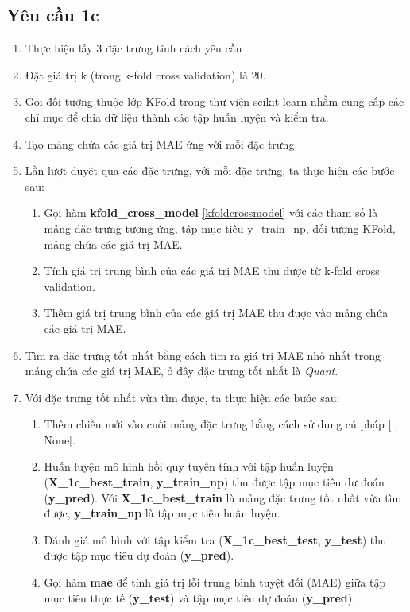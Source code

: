 \documentclass[]{article}
\begin{document}
\subsection{Yêu cầu 1c}
\begin{enumerate}
  \item Thực hiện lấy 3 đặc trưng tính cách yêu cầu
  \item Đặt giá trị k (trong k-fold cross validation) là 20.
  \item Gọi đối tượng thuộc lớp KFold trong thư viện scikit-learn nhằm cung cấp các chỉ mục để chia dữ liệu thành các tập huấn luyện và kiểm tra. 
  \item Tạo mảng chứa các giá trị MAE ứng với mỗi đặc trưng.
  \item Lần lượt duyệt qua các đặc trưng, với mỗi đặc trưng, ta thực hiện các bước sau:
  \begin{enumerate}
    \item Gọi hàm \textbf{kfold\_cross\_model} \ref{kfoldcrossmodel} với các tham số là mảng đặc trưng tương ứng, tập mục tiêu y\_train\_np, đối tượng KFold, mảng chứa các giá trị MAE.
    \item Tính giá trị trung bình của các giá trị MAE thu được từ k-fold cross validation.
    \item Thêm giá trị trung bình của các giá trị MAE thu được vào mảng chứa các giá trị MAE.
  \end{enumerate}
  \item Tìm ra đặc trưng tốt nhất bằng cách tìm ra giá trị MAE nhỏ nhất trong mảng chứa các giá trị MAE, ở đây đặc trưng tốt nhất là \textit{Quant}.
  \item Với đặc trưng tốt nhất vừa tìm được, ta thực hiện các bước sau:
  \begin{enumerate}
    \item Thêm chiều mới vào cuối mảng đặc trưng bằng cách sử dụng cú pháp [:, None].
    \item Huấn luyện mô hình hồi quy tuyến tính với tập huấn luyện (\textbf{X\_1c\_best\_train}, \textbf{y\_train\_np}) thu được tập mục tiêu dự đoán (\textbf{y\_pred}). Với \textbf{X\_1c\_best\_train} là mảng đặc trưng tốt nhất vừa tìm được, \textbf{y\_train\_np} là tập mục tiêu huấn luyện.
    \item Đánh giá mô hình với tập kiểm tra (\textbf{X\_1c\_best\_test}, \textbf{y\_test}) thu được tập mục tiêu dự đoán (\textbf{y\_pred}).
    \item Gọi hàm \textbf{mae} để tính giá trị lỗi trung bình tuyệt đối (MAE) giữa tập mục tiêu thực tế (\textbf{y\_test}) và tập mục tiêu dự đoán (\textbf{y\_pred}).
  \end{enumerate}
\end{enumerate}
\end{document}
